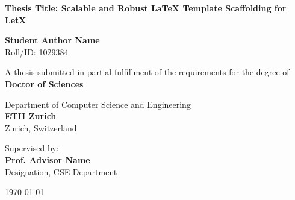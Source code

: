 \begin{titlepage}
\begin{center}
    \vspace*{1cm}
    
    
    \vspace{1.5cm}
    
    {\huge \bfseries \color{primary} Thesis Title: Scalable and Robust LaTeX Template Scaffolding for LetX}
    
    \vspace{1.5cm}
    
    {\Large \bfseries Student Author Name} \\
    \vspace{0.2cm}
    {Roll/ID: 1029384}
    
    \vspace{1.5cm}
    
    {A thesis submitted in partial fulfillment of the requirements for the degree of} \\
    \vspace{0.3cm}
    {\large \bfseries \color{secondary} Doctor of Sciences}
    
    \vspace{1.5cm}
    
    {Department of Computer Science and Engineering} \\
    \vspace{0.2cm}
    {\large \bfseries \color{primary} ETH Zurich} \\
    \vspace{0.1cm}
    {Zurich, Switzerland}
    
    \vfill
    
    {Supervised by:} \\
    {\large \bfseries Prof. Advisor Name} \\
    {Designation, CSE Department}
    
    \vspace{1cm}
    
    {\large \today}
    
\end{center}
\end{titlepage}
